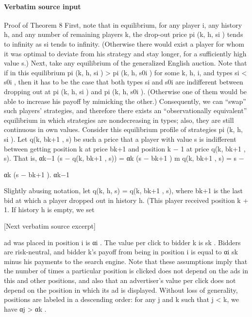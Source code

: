 \documentclass[10pt]{article}
\begin{document}
\paragraph{Verbatim source input}
\begin{ReviewVerbatim}
Proof of Theorem 8
First, note that in equilibrium, for any player i, any history h, and any number of remaining players
k, the drop-out price pi (k, h, si ) tends to infinity as si tends to infinity. (Otherwise there would
exist a player for whom it was optimal to deviate from his strategy and stay longer, for a sufficiently
high value s.) Next, take any equilibrium of the generalized English auction. Note that if in this
equilibrium pi (k, h, si ) > pi (k, h, s0i ) for some k, h, i, and types si < s0i , then it has to be the
case that both types si and s0i are indifferent between dropping out at pi (k, h, si ) and pi (k, h, s0i ).
(Otherwise one of them would be able to increase his payoff by mimicking the other.) Consequently,
we can “swap” such players’ strategies, and therefore there exists an “observationally equivalent”
equilibrium in which strategies are nondecreasing in types; also, they are still continuous in own
values. Consider this equilibrium profile of strategies pi (k, h, si ).
Let q(k, bk+1 , s) be such a price that a player with value s is indifferent between getting position
k at price bk+1 and position k − 1 at price q(k, bk+1 , s). That is,
αk−1 (s − q(k, bk+1 , s)) = αk (s − bk+1 )
m
q(k, bk+1 , s) = s −

αk
(s − bk+1 ).
αk−1

Slightly abusing notation, let q(k, h, s) = q(k, bk+1 , s), where bk+1 is the last bid at which a player
dropped out in history h. (This player received position k + 1. If history h is empty, we set

[Next verbatim source excerpt]

ad was placed in position i is αi . The value per click to bidder k is sk . Bidders are risk-neutral,
and bidder k’s payoff from being in position i is equal to αi sk minus his payments to the search
engine. Note that these assumptions imply that the number of times a particular position is clicked
does not depend on the ads in this and other positions, and also that an advertiser’s value per click
does not depend on the position in which its ad is displayed. Without loss of generality, positions
are labeled in a descending order: for any j and k such that j < k, we have αj > αk .
\end{ReviewVerbatim}
\end{document}
